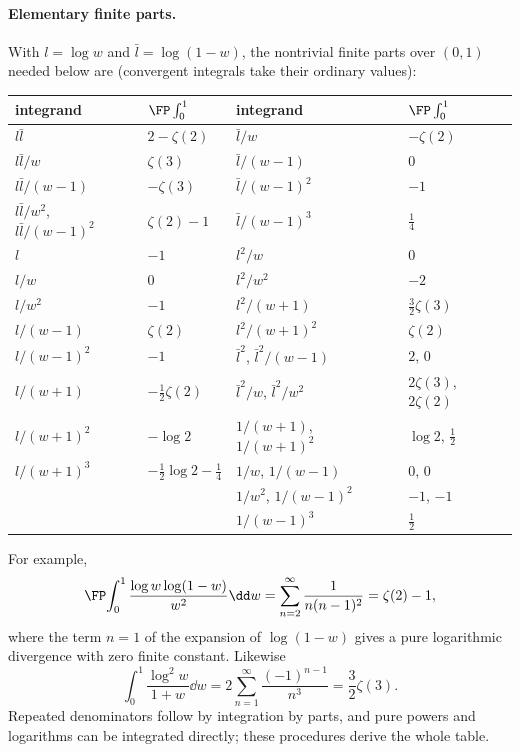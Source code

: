 \paragraph{Elementary finite parts.} With $l=\log w$ and $\bar l=\log(1-w)$, the nontrivial finite parts over $(0,1)$
needed below are (convergent integrals take their ordinary values):
\begin{center}\small
\renewcommand{\arraystretch}{1.25}
\begin{tabular}{@{}ll@{\qquad\qquad}ll@{}}
\toprule
integrand & $\FP\int_0^1$ & integrand & $\FP\int_0^1$\\
\midrule
$l\bar l$ & $2-\zeta(2)$ & $\bar l/w$ & $-\zeta(2)$\\
$l\bar l/w$ & $\zeta(3)$ & $\bar l/(w-1)$ & $0$\\
$l\bar l/(w-1)$ & $-\zeta(3)$ & $\bar l/(w-1)^2$ & $-1$\\
$l\bar l/w^2$, $l\bar l/(w-1)^2$ & $\zeta(2)-1$ & $\bar l/(w-1)^3$ & $\frac14$\\
$l$ & $-1$ & $l^2/w$ & $0$\\
$l/w$ & $0$ & $l^2/w^2$ & $-2$\\
$l/w^2$ & $-1$ & $l^2/(w+1)$ & $\frac32\zeta(3)$\\
$l/(w-1)$ & $\zeta(2)$ & $l^2/(w+1)^2$ & $\zeta(2)$\\
$l/(w-1)^2$ & $-1$ & $\bar l^2$, $\bar l^2/(w-1)$ & $2$, $0$\\
$l/(w+1)$ & $-\frac12\zeta(2)$ & $\bar l^2/w$, $\bar l^2/w^2$ & $2\zeta(3)$, $2\zeta(2)$\\
$l/(w+1)^2$ & $-\log2$ & $1/(w+1)$, $1/(w+1)^2$ & $\log2$, $\frac12$\\
$l/(w+1)^3$ & $-\frac12\log2-\frac14$ & $1/w$, $1/(w-1)$ & $0$, $0$\\
& & $1/w^2$, $1/(w-1)^2$ & $-1$, $-1$\\
& & $1/(w-1)^3$ & $\frac12$\\
\bottomrule
\end{tabular}
\end{center}
For example,
\begin{equation}
 \FP\!\int_0^1\frac{\log w\log(1-w)}{w^2}\dd w=\sum_{n=2}^\infty\frac1{n(n-1)^2}=\zeta(2)-1,
\end{equation}
where the term $n=1$ of the expansion of $\log(1-w)$ gives a pure logarithmic divergence with zero finite constant.
Likewise
\begin{equation}
 \int_0^1\frac{\log^2w}{1+w}\dd w=2\sum_{n=1}^\infty\frac{(-1)^{n-1}}{n^3}=\frac32\zeta(3).
\end{equation}
Repeated denominators follow by integration by parts, and pure powers and logarithms can be integrated directly; these
procedures derive the whole table.

